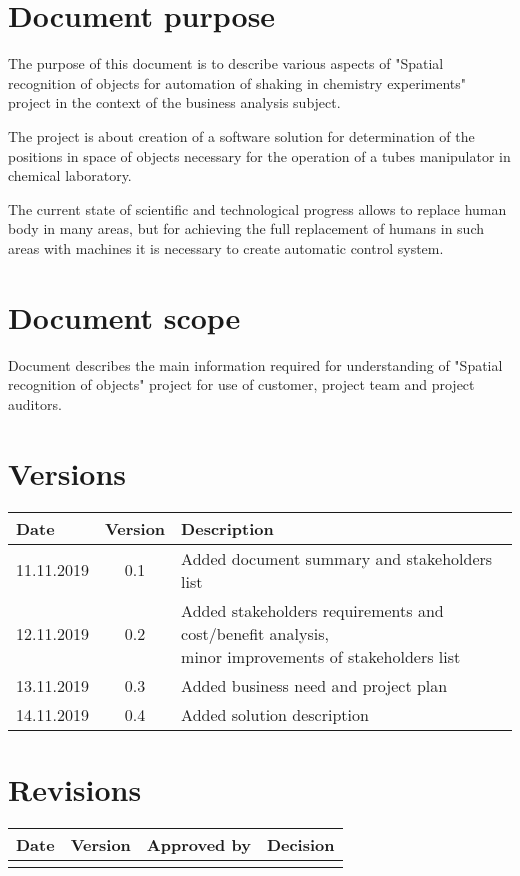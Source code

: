 \section{Document purpose} 

The purpose of this document is to describe various aspects of "Spatial recognition of objects
for automation of shaking in chemistry experiments" project in the context of the business analysis subject.


The project is about creation of a software solution for determination of the positions
in space of objects necessary for the operation of a tubes manipulator in chemical laboratory.

The current state of scientific and technological progress allows to replace human body
in many areas, but for achieving the full replacement of humans in such areas with machines
it is necessary to create automatic control system.


\section{Document scope}

Document describes the main information required for understanding of "Spatial recognition of objects"
project for use of customer, project team and project auditors.


\section{Versions}


\begin{tabular}{ | l | c | l | }
	\hline
	Date & Version & Description \\ \hline
	11.11.2019 &  0.1 & Added document summary and stakeholders list \\ \hline
	12.11.2019 &  0.2 & \specialcell{Added stakeholders requirements and cost/benefit analysis,\\ minor improvements of stakeholders list} \\ \hline
	13.11.2019 &  0.3 & Added business need and project plan \\ \hline
	14.11.2019 &  0.4 & Added solution description \\ \hline
\end{tabular}


\section{Revisions}

\begin{tabular}{ | l | c | c | l | }
	\hline
	Date & Version & Approved by & Decision \\ \hline
	& & & \\ \hline
\end{tabular}